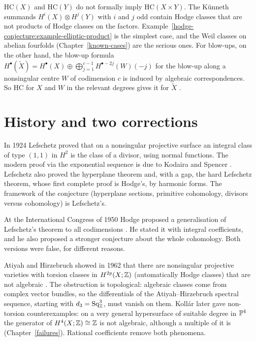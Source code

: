 \begin{remark}\label{hodge-conjecture:remark-products}
$\mathrm{HC}(X)$ and $\mathrm{HC}(Y)$ do not formally imply $\mathrm{HC}(X \times Y)$. The K\"unneth summands $H^i(X) \otimes H^j(Y)$ with $i$ and $j$ odd contain Hodge classes that are not
products of Hodge classes on the factors. Example~\ref{hodge-conjecture:example-elliptic-product} is the simplest case, and the Weil classes on abelian fourfolds
(Chapter~\ref{known-cases}) are the serious ones. For blow-ups, on the other hand, the blow-up formula $H^\bullet(\tilde X) = H^\bullet(X) \oplus \bigoplus_{j=1}^{c-1}H^{\bullet-2j}(W)(-j)$ for the blow-up
along a nonsingular centre $W$ of codimension $c$ is induced by algebraic correspondences. So $\mathrm{HC}$ for $X$ and $W$ in the relevant degrees gives it for $\tilde X$ \cite[Theorem 7.31]{voisin-hodge-1}.
\end{remark}

\section{History and two corrections}\label{hodge-conjecture:section-history}

\begin{remark}[Lefschetz]\label{hodge-conjecture:remark-lefschetz}
In 1924 Lefschetz proved that on a nonsingular projective surface an integral class of type $(1,1)$ in $H^2$ is the class of a divisor, using normal functions. The modern proof via the
exponential sequence is due to Kodaira and Spencer \cite{kodaira-spencer-1953}. Lefschetz also proved the hyperplane theorem and, with a gap, the hard Lefschetz theorem, whose first complete
proof is Hodge's, by harmonic forms. The framework of the conjecture (hyperplane sections, primitive cohomology, divisors versus cohomology) is Lefschetz's.
\end{remark}

\begin{remark}[Hodge]\label{hodge-conjecture:remark-hodge-1950}
At the International Congress of 1950 Hodge proposed a generalisation of Lefschetz's theorem to all codimensions \cite{hodge-1950}. He stated it with integral coefficients, and he also
proposed a stronger conjecture about the whole cohomology. Both versions were false, for different reasons.
\end{remark}

\begin{remark}\label{hodge-conjecture:remark-integral}
Atiyah and Hirzebruch showed in 1962 that there are nonsingular projective varieties with torsion classes in $H^{2p}(X; \mathbb{Z})$ (automatically Hodge classes) that are not algebraic
\cite{atiyah-hirzebruch-1962}. The obstruction is topological: algebraic classes come from complex vector bundles, so the differentials of the Atiyah--Hirzebruch spectral sequence, starting
with $d_3 = \mathrm{Sq}^3_{\mathbb{Z}}$, must vanish on them. Koll\'ar later gave non-torsion counterexamples: on a very general hypersurface of suitable degree in $\mathbb{P}^4$ the generator of
$H^4(X; \mathbb{Z}) \cong \mathbb{Z}$ is not algebraic, although a multiple of it is (Chapter~\ref{failures}). Rational coefficients remove both phenomena.
\end{remark}

